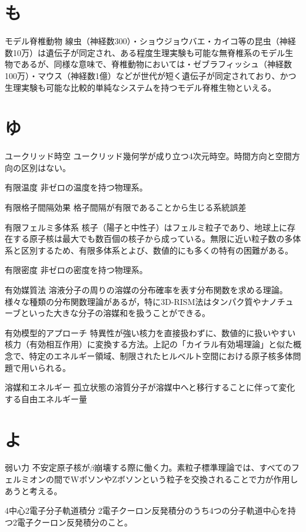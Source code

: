 \begin{用語集}
\section{も}
\item{モデル脊椎動物}{}
{線虫（神経数300）・ショウジョウバエ・カイコ等の昆虫（神経数10万）は遺伝子が同定され、ある程度生理実験も可能な無脊椎系のモデル生物であるが、同様な意味で、脊椎動物においては・ゼブラフィッシュ（神経数100万）・マウス（神経数1億）などが世代が短く遺伝子が同定されており、かつ生理実験も可能な比較的単純なシステムを持つモデル脊椎生物といえる。}
\section{ゆ}
\item{ユークリッド時空}{}
{ユークリッド幾何学が成り立つ4次元時空。時間方向と空間方向の区別はない。}
\item{有限温度}{}
{非ゼロの温度を持つ物理系。}
\item{有限格子間隔効果}{}
{格子間隔が有限であることから生じる系統誤差}
\item{有限フェルミ多体系}{}
{核子（陽子と中性子）はフェルミ粒子であり、地球上に存在する原子核は最大でも数百個の核子から成っている。無限に近い粒子数の多体系と区別するため、有限多体系とよび、数値的にも多くの特有の困難がある。}
\item{有限密度}{}
{非ゼロの密度を持つ物理系。}
\item{有効媒質法}{}
{溶液分子の周りの溶媒の分布確率を表す分布関数を求める理論。様々な種類の分布関数理論があるが，特に3D-RISM法はタンパク質やナノチューブといった大きな分子の溶媒和を扱うことができる。}
\item{有効模型的アプローチ}{}
{特異性が強い核力を直接扱わずに、数値的に扱いやすい核力（有効相互作用）に変換する方法。上記の「カイラル有効場理論」と似た概念で、特定のエネルギー領域、制限されたヒルベルト空間における原子核多体問題で用いられる。}
\item{溶媒和エネルギー}{}
{孤立状態の溶質分子が溶媒中へと移行することに伴って変化する自由エネルギー量}
\section{よ}
\item{弱い力}{}
{不安定原子核が$\beta$崩壊する際に働く力。素粒子標準理論では、すべてのフェルミオンの間でWボソンやZボソンという粒子を交換されることで力が作用しあうと考える。}
\item{4中心2電子分子軌道積分}{}
{2電子クーロン反発積分のうち4つの分子軌道中心を持つ2電子クーロン反発積分のこと。}

\end{用語集}
